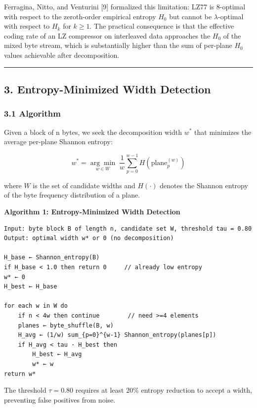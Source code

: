 \documentclass[
  11pt,
  letterpaper,
]{article}
\makeatletter
\renewcommand{\_}{\bpd@origunderscore\allowbreak}
\makeatother
\begin{document}
Ferragina, Nitto, and Venturini {[}9{]} formalized this limitation: LZ77
is 8-optimal with respect to the zeroth-order empirical entropy \(H_0\)
but cannot be \(\lambda\)-optimal with respect to \(H_k\) for
\(k \ge 1\). The practical consequence is that the effective coding rate
of an LZ compressor on interleaved data approaches the \(H_0\) of the
mixed byte stream, which is substantially higher than the sum of
per-plane \(H_0\) values achievable after decomposition.

\begin{center}\rule{0.5\linewidth}{0.5pt}\end{center}

\hypertarget{entropy-minimized-width-detection}{%
\subsection{3. Entropy-Minimized Width
Detection}\label{entropy-minimized-width-detection}}

\hypertarget{algorithm}{%
\subsubsection{3.1 Algorithm}\label{algorithm}}

Given a block of n bytes, we seek the decomposition width \(w^*\) that
minimizes the average per-plane Shannon entropy:

\[w^* = \underset{w \in W}{\arg\min} \; \frac{1}{w} \sum_{p=0}^{w-1} H(\text{plane}_p^{(w)})\]

where \(W\) is the set of candidate widths and \(H(\cdot)\) denotes the
Shannon entropy of the byte frequency distribution of a plane.

\textbf{Algorithm 1: Entropy-Minimized Width Detection}

\begin{verbatim}
Input: byte block B of length n, candidate set W, threshold tau = 0.80
Output: optimal width w* or 0 (no decomposition)

H_base ← Shannon_entropy(B)
if H_base < 1.0 then return 0     // already low entropy
w* ← 0
H_best ← H_base

for each w in W do
    if n < 4w then continue        // need >=4 elements
    planes ← byte_shuffle(B, w)
    H_avg ← (1/w) sum_{p=0}^{w-1} Shannon_entropy(planes[p])
    if H_avg < tau · H_best then
        H_best ← H_avg
        w* ← w
return w*
\end{verbatim}

The threshold \(\tau = 0.80\) requires at least 20\% entropy reduction
to accept a width, preventing false positives from noise.
\end{document}
